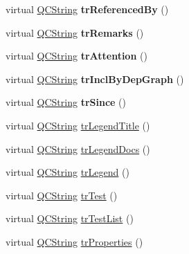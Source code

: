 \begin{DoxyCompactItemize}
virtual \mbox{\hyperlink{class_q_c_string}{Q\+C\+String}} {\bfseries tr\+Referenced\+By} ()
\item 
\mbox{\label{class_translator_serbian_cyrillic_a01d4b3b8c0ab94fd39745dff314a4616}} 
virtual \mbox{\hyperlink{class_q_c_string}{Q\+C\+String}} {\bfseries tr\+Remarks} ()
\item 
\mbox{\label{class_translator_serbian_cyrillic_aa69e5c21cf1454163978b88586dd4e95}} 
virtual \mbox{\hyperlink{class_q_c_string}{Q\+C\+String}} {\bfseries tr\+Attention} ()
\item 
\mbox{\label{class_translator_serbian_cyrillic_afa0b5d02d75de53ed3b08132f302e983}} 
virtual \mbox{\hyperlink{class_q_c_string}{Q\+C\+String}} {\bfseries tr\+Incl\+By\+Dep\+Graph} ()
\item 
\mbox{\label{class_translator_serbian_cyrillic_a40c0bb65686ce28684d761d0e39b80a7}} 
virtual \mbox{\hyperlink{class_q_c_string}{Q\+C\+String}} {\bfseries tr\+Since} ()
\item 
virtual \mbox{\hyperlink{class_q_c_string}{Q\+C\+String}} \mbox{\hyperlink{class_translator_serbian_cyrillic_a862a73dd2e1fb19e00cd8f13ef20dfa2}{tr\+Legend\+Title}} ()
\item 
virtual \mbox{\hyperlink{class_q_c_string}{Q\+C\+String}} \mbox{\hyperlink{class_translator_serbian_cyrillic_ab7f39c42a0e790816df7723eef4fcc21}{tr\+Legend\+Docs}} ()
\item 
virtual \mbox{\hyperlink{class_q_c_string}{Q\+C\+String}} \mbox{\hyperlink{class_translator_serbian_cyrillic_a75d750ec709bd32814486d1a62e7d2bc}{tr\+Legend}} ()
\item 
virtual \mbox{\hyperlink{class_q_c_string}{Q\+C\+String}} \mbox{\hyperlink{class_translator_serbian_cyrillic_abcd9eac8a07dc71bc67d75504e5f5fba}{tr\+Test}} ()
\item 
virtual \mbox{\hyperlink{class_q_c_string}{Q\+C\+String}} \mbox{\hyperlink{class_translator_serbian_cyrillic_aba8a9441f333d4b798e1792422d22b87}{tr\+Test\+List}} ()
\item 
virtual \mbox{\hyperlink{class_q_c_string}{Q\+C\+String}} \mbox{\hyperlink{class_translator_serbian_cyrillic_a073934ac0520cbecf6cf0dc65b19deb5}{tr\+Properties}} ()
\item 

\end{DoxyCompactItemize}
